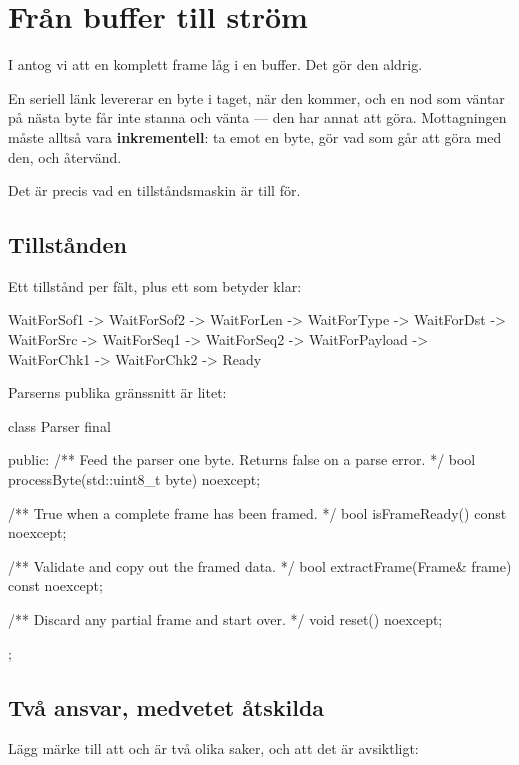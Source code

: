 \section{Från buffer till ström}
\label{sec:frombuffer}

I  antog vi att en komplett frame låg i en buffer. Det gör den aldrig.

En seriell länk levererar en byte i taget, när den kommer, och en nod som väntar på nästa byte får
inte stanna och vänta --- den har annat att göra. Mottagningen måste alltså vara
\textbf{inkrementell}: ta emot en byte, gör vad som går att göra med den, och återvänd.

Det är precis vad en tillståndsmaskin är till för.

\subsection{Tillstånden}

Ett tillstånd per fält, plus ett som betyder klar:

\begin{console}
WaitForSof1 -> WaitForSof2 -> WaitForLen  -> WaitForType -> WaitForDst
            -> WaitForSrc  -> WaitForSeq1 -> WaitForSeq2 -> WaitForPayload
            -> WaitForChk1 -> WaitForChk2 -> Ready
\end{console}

Parserns publika gränssnitt är litet:

\begin{cppcode}
class Parser final
{
public:
    /** Feed the parser one byte. Returns false on a parse error. */
    bool processByte(std::uint8_t byte) noexcept;

    /** True when a complete frame has been framed. */
    bool isFrameReady() const noexcept;

    /** Validate and copy out the framed data. */
    bool extractFrame(Frame& frame) const noexcept;

    /** Discard any partial frame and start over. */
    void reset() noexcept;
};
\end{cppcode}

\subsection{Två ansvar, medvetet åtskilda}

Lägg märke till att  och  är två olika saker, och att
det är avsiktligt:

